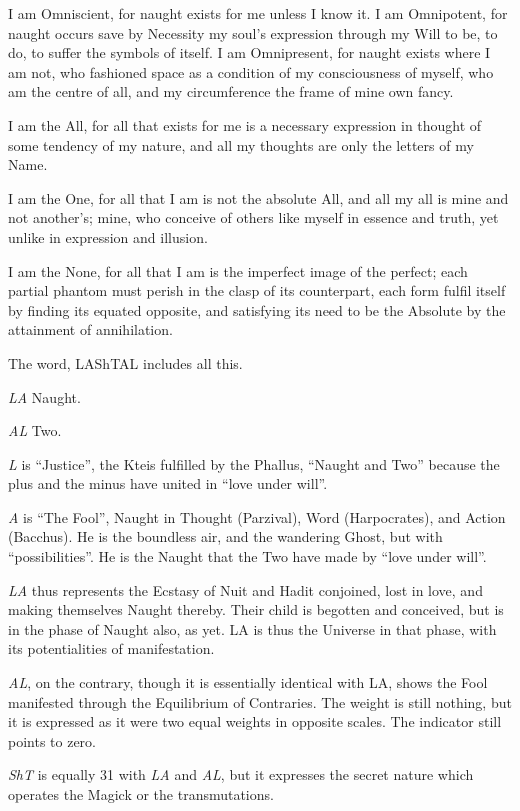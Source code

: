 I am Omniscient, for naught exists for me unless I know it. I am Omnipotent, for naught occurs save by Necessity my soul's expression through my Will to be, to do, to suffer the symbols of itself. I am Omnipresent, for naught exists where I am not, who fashioned space as a condition of my consciousness of myself, who am the centre of all, and my circumference the frame of mine own fancy.

I am the All, for all that exists for me is a necessary expression in thought of some tendency of my nature, and all my thoughts are only the letters of my Name.

I am the One, for all that I am is not the absolute All, and all my all is mine and not another's; mine, who conceive of others like myself in essence and truth, yet unlike in expression and illusion.

I am the None, for all that I am is the imperfect image of the perfect; each partial phantom must perish in the clasp of its counterpart, each form fulfil itself by finding its equated opposite, and satisfying its need to be the Absolute by the attainment of annihilation.

The word, LAShTAL includes all this.

\textit{LA} \textemdash{} Naught.

\textit{AL} \textemdash{} Two.

\textit{L} is \enquote{Justice}, the Kteis fulfilled by the Phallus, \enquote{Naught and Two} because the plus and the minus have united in \enquote{love under will}.

\textit{A} is \enquote{The Fool}, Naught in Thought (Parzival), Word (Harpocrates), and Action (Bacchus). He is the boundless air, and the wandering Ghost, but with \enquote{possibilities}. He is the Naught that the Two have made by \enquote{love under will}.

\textit{LA} thus represents the Ecstasy of Nuit and Hadit conjoined, lost in love, and making themselves Naught thereby. Their child is begotten and conceived, but is in the phase of Naught also, as yet. LA is thus the Universe in that phase, with its potentialities of manifestation.

\textit{AL}, on the contrary, though it is essentially identical with LA, shows the Fool manifested through the Equilibrium of Contraries. The weight is still nothing, but it is expressed as it were two equal weights in opposite scales. The indicator still points to zero.

\textit{ShT} is equally 31 with \textit{LA} and \textit{AL}, but it expresses the secret nature which operates the Magick or the transmutations.

